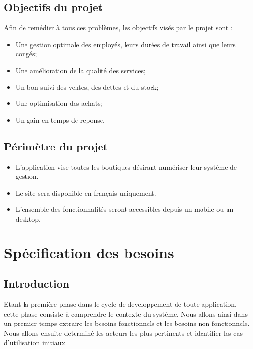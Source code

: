 \documentclass[a4paper,11pt]{article}
\begin{document}
\subsection{Objectifs du projet}
Afin de remédier à tous ces problèmes, les objectifs visés par le projet sont :
\begin{itemize}
  \item Une gestion optimale des employés, leurs durées de travail ainsi que leurs congés;
  \item Une amélioration de la qualité des services;
  \item Un bon suivi des ventes, des dettes et du stock;
  \item Une optimisation des achats;
  \item Un gain en temps de reponse.
\end{itemize}
   
\subsection{Périmètre du projet}

\begin{itemize}
  \item L'application vise toutes les boutiques désirant numériser leur système de gestion.
  \item Le site sera disponible en français uniquement.
  \item L'ensemble des fonctionnalités seront accessibles depuis un mobile ou un desktop.
\end{itemize}


\newpage

\section{Spécification des besoins}

\subsection*{Introduction}
Etant la première phase dans le cycle de developpement de toute application, cette phase consiste à comprendre le contexte du système.
\newline Nous allons ainsi dans un premier temps extraire les besoins fonctionnels et les besoins non fonctionnels. Nous allons ensuite determiné les acteurs les plus pertinents et identifier les cas
d'utilisation initiaux
\end{document}
